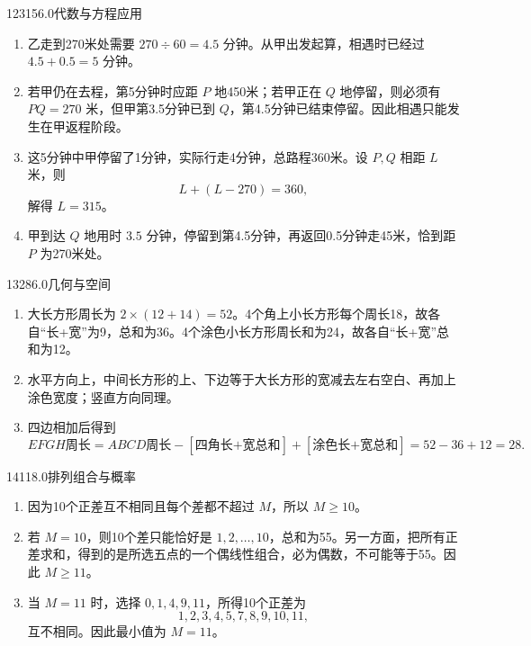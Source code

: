 \begin{solution}{12}{315}{6.0}{代数与方程应用}
\begin{enumerate}[label=\textbf{Step \arabic*:},leftmargin=*]
\item 乙走到270米处需要 \(270\div60=4.5\) 分钟。从甲出发起算，相遇时已经过 \(4.5+0.5=5\) 分钟。
\item 若甲仍在去程，第5分钟时应距 \(P\) 地450米；若甲正在 \(Q\) 地停留，则必须有 \(PQ=270\) 米，但甲第3.5分钟已到 \(Q\)，第4.5分钟已结束停留。因此相遇只能发生在甲返程阶段。
\item 这5分钟中甲停留了1分钟，实际行走4分钟，总路程360米。设 \(P,Q\) 相距 \(L\) 米，则
\[
  L+(L-270)=360,
\]
解得 \(L=315\)。
\item 甲到达 \(Q\) 地用时 \(3.5\) 分钟，停留到第4.5分钟，再返回0.5分钟走45米，恰到距 \(P\) 为270米处。
\end{enumerate}
\end{solution}

\begin{solution}{13}{28}{6.0}{几何与空间}
\begin{enumerate}[label=\textbf{Step \arabic*:},leftmargin=*]
\item 大长方形周长为 \(2\times(12+14)=52\)。4个角上小长方形每个周长18，故各自“长+宽”为9，总和为36。4个涂色小长方形周长和为24，故各自“长+宽”总和为12。
\item 水平方向上，中间长方形的上、下边等于大长方形的宽减去左右空白、再加上涂色宽度；竖直方向同理。
\item 四边相加后得到
\[
  EFGH\text{周长}
  =ABCD\text{周长}
  -[\text{四角长+宽总和}]
  +[\text{涂色长+宽总和}]
  =52-36+12=28.
\]
\end{enumerate}
\end{solution}

\begin{solution}{14}{11}{8.0}{排列组合与概率}
\begin{enumerate}[label=\textbf{Step \arabic*:},leftmargin=*]
\item 因为10个正差互不相同且每个差都不超过 \(M\)，所以 \(M\ge10\)。
\item 若 \(M=10\)，则10个差只能恰好是 \(1,2,\ldots,10\)，总和为55。另一方面，把所有正差求和，得到的是所选五点的一个偶线性组合，必为偶数，不可能等于55。因此 \(M\ge11\)。
\item 当 \(M=11\) 时，选择 \(0,1,4,9,11\)，所得10个正差为
\[
  1,2,3,4,5,7,8,9,10,11,
\]
互不相同。因此最小值为 \(M=11\)。
\end{enumerate}
\end{solution}

